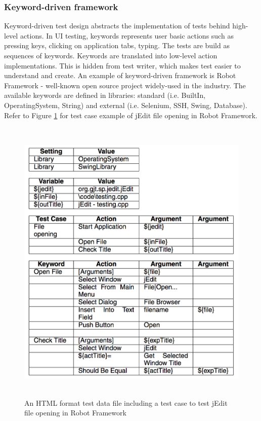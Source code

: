 \documentclass[12pt,twoside]{article}
\begin{document}
\subsubsection{Keyword-driven framework}
Keyword-driven test design abstracts the implementation of tests behind high-level actions. In UI testing, keywords represents user basic actions such as pressing keys, clicking on application tabs, typing. The tests are build as sequences of keywords. Keywords are translated into low-level action implementations. This is hidden from test writer, which makes test easier to understand and create. An example of keyword-driven framework is Robot Framework - well-known open source project widely-used in the industry. The available keywords are defined in libraries: standard (i.e. BuiltIn, OperatingSystem, String) and external (i.e. Selenium, SSH, Swing, Database). Refer to Figure \ref{robot_tc} for test case example of jEdit file opening in Robot Framework.

\begin{figure}[H]
\centering
\includegraphics[width=120mm, height=140mm]{robot_tc.png}
\caption{An HTML format test data file including a test case
to test jEdit file opening in Robot Framework ~\cite{ref:2.1} }
\label{robot_tc}
\end{figure}
\end{document}
